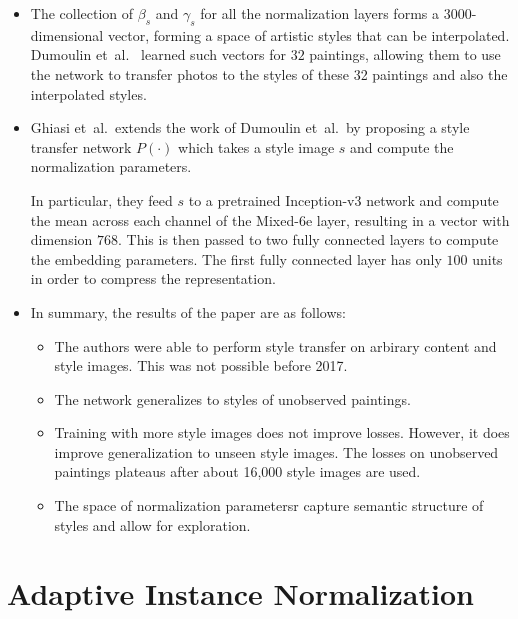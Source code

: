 \documentclass[10pt]{article}
\newcommand{\etal}{{et~al.}}
\begin{document}
\begin{itemize}
  	\item The collection of $\beta_s$ and $\gamma_s$ for all the normalization layers forms a 3000-dimensional vector, forming a space of artistic styles that can be interpolated. Dumoulin \etal~\cite{Dumoulin:2016} learned such vectors for $32$ paintings, allowing them to use the network to transfer photos to the styles of these 32 paintings and also the interpolated styles.

  	\item Ghiasi \etal\ extends the work of Dumoulin \etal\ by proposing a style transfer network $P(\cdot)$ which takes a style image $s$ and compute the normalization parameters.

  	In particular, they feed $s$ to a pretrained Inception-v3 network and compute the mean across each channel of the Mixed-6e layer, resulting in a vector with dimension $768$. This is then passed to two fully connected layers to compute the embedding parameters. The first fully connected layer has only $100$ units in order to compress the representation.

  	\item In summary, the results of the paper are as follows:
  	\begin{itemize}
  	 	\item The authors were able to perform style transfer on arbirary content and style images. This was not possible before 2017.

  	 	\item The network generalizes to styles of unobserved paintings.

  	 	\item Training with more style images does not improve losses. However, it does improve generalization to unseen style images. The losses on unobserved paintings plateaus after about 16,000 style images are used.

  	 	\item The space of normalization parametersr capture semantic structure of styles and allow for exploration.
  	 \end{itemize} 
  \end{itemize}

  \section{Adaptive Instance Normalization}
\end{document}
